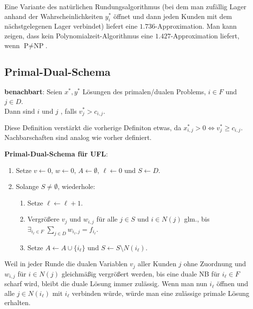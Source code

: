\linie

Eine Variante des natürlichen Rundungsalgorithmus
(bei dem man zufällig Lager anhand der Wahrscheinlichkeiten $y_i^\ast$ öffnet und dann
jeden Kunden mit dem nächstgelegenen Lager verbindet)
liefert eine $1.736$-Approximation.
Man kann zeigen, dass kein Polynomialzeit-Algorithmus eine $1.427$-Approximation liefert,
wenn $\text{P} \not= \text{NP}$.

\pagebreak

\subsection{%
    Primal-Dual-Schema%
}

\textbf{benachbart}:
Seien $x^\ast, y^\ast$ Lösungen des primalen/dualen Problems, $i \in F$ und $j \in D$.\\
Dann sind $i$ und $j$ , falls $v_j^\ast > c_{i,j}$.

Diese Definition verstärkt die vorherige Definiton etwas, da
$x_{i,j}^\ast > 0 \iff v_j^\ast \ge c_{i,j}$.\\
Nachbarschaften sind analog wie vorher definiert.

\linie

\textbf{Primal-Dual-Schema für UFL}:
\begin{enumerate}
    \item
    Setze $v \leftarrow 0$,
    $w \leftarrow 0$,
    $A \leftarrow \emptyset$,
    $\ell \leftarrow 0$ und
    $S \leftarrow D$.

    \item
    Solange $S \not= \emptyset$, wiederhole:
    \begin{enumerate}
        \item
        Setze $\ell \leftarrow \ell + 1$.

        \item
        Vergrößere $v_j$ und $w_{i,j}$ für alle $j \in S$ und $i \in N(j)$ glm.,
        bis $\exists_{i_\ell \in F}\; \sum_{j \in D} w_{i_\ell,j} = f_{i_\ell}$.

        \item
        Setze $A \leftarrow A \cup \{i_\ell\}$
        und $S \leftarrow S \setminus N(i_\ell)$.
    \end{enumerate}
\end{enumerate}

Weil in jeder Runde die dualen Variablen $v_j$ aller Kunden $j$ ohne Zuordnung
und $w_{i,j}$ für $i \in N(j)$ gleichmäßig vergrößert werden,
bis eine duale NB für $i_\ell \in F$ scharf wird,
bleibt die duale Lösung immer zulässig.
Wenn man nun $i_\ell$ öffnen und alle $j \in N(i_\ell)$ mit $i_\ell$ verbinden würde,
würde man eine zulässige primale Lösung erhalten.

